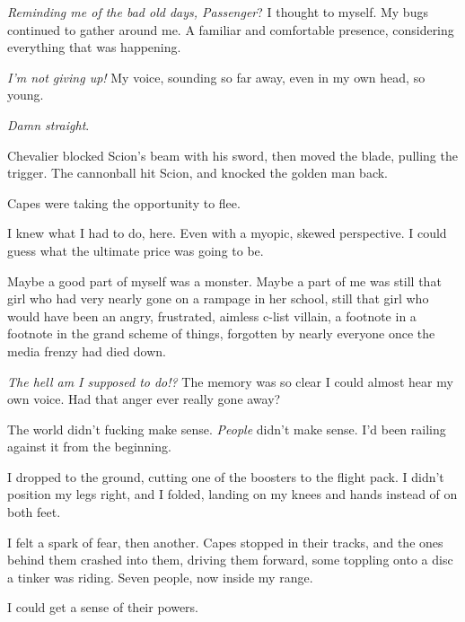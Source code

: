 \emph{Reminding me of the bad old days, Passenger}?  I thought to myself.  My bugs continued to gather around me.  A familiar and comfortable presence, considering everything that was happening.



\emph{I'm not giving up!}  My voice, sounding so far away, even in my own head, so young.



\emph{Damn straight}.



Chevalier blocked Scion's beam with his sword, then moved the blade, pulling the trigger.  The cannonball hit Scion, and knocked the golden man back.



Capes were taking the opportunity to flee.



I knew what I had to do, here.  Even with a myopic, skewed perspective.  I could guess what the ultimate price was going to be.



Maybe a good part of myself was a monster.  Maybe a part of me was still that girl who had very nearly gone on a rampage in her school, still that girl who would have been an angry, frustrated, aimless c-list villain, a footnote in a footnote in the grand scheme of things, forgotten by nearly everyone once the media frenzy had died down.



\emph{The hell am I supposed to do!?}  The memory was so clear I could almost hear my own voice.  Had that anger ever really gone away?



The world didn't fucking make sense.  \emph{People} didn't make sense.  I'd been railing against it from the beginning.



I dropped to the ground, cutting one of the boosters to the flight pack.  I didn't position my legs right, and I folded, landing on my knees and hands instead of on both feet.



I felt a spark of fear, then another.  Capes stopped in their tracks, and the ones behind them crashed into them, driving them forward, some toppling onto a disc a tinker was riding.  Seven people, now inside my range.



I could get a sense of their powers.



